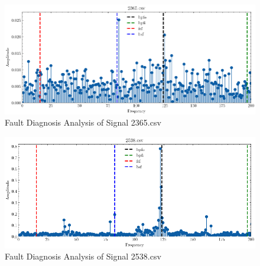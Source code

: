 \documentclass[conference]{IEEEtran}
\begin{document}
\begin{figure}[htbp]
    \centerline{\includegraphics[width=\textwidth]{figure/fig_12.png}}
    \caption{Fault Diagnosis Analysis of Signal 2365.csv}
    \label{fig_12}
\end{figure}

\begin{figure}[htbp]
    \centerline{\includegraphics[width=\textwidth]{figure/fig_15.png}}
    \caption{Fault Diagnosis Analysis of Signal 2538.csv}
    \label{fig_15}
\end{figure}
\end{document}
